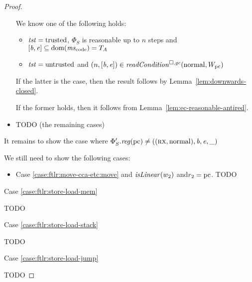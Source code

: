 \begin{proof}
\begin{itemize}
    We know one of the following holds:
    \begin{itemize}
    \item $\mathit{tst} = \mathrm{trusted}$, $\Phi_S$ is reasonable up to $n$ steps and $[\baddr,\eaddr] \subseteq \dom(\mscode) = \ta$
    \item $\mathit{tst} = \mathrm{untrusted}$ and $\npair{[\baddr,\eaddr]} \in \readCond{\normal,W_\pcreg}$
    \end{itemize}
    If the latter is the case, then the result follows by Lemma~\ref{lem:downwards-closed}.

    If the former holds, then it follows from Lemma~\ref{lem:ec-reasonable-antired}.

    \item TODO (the remaining cases)
  \end{itemize}

  It remains to show the case where $\Phi_S'.\reg(\pcreg) \neq ((\rx,\normal),\baddr,\eaddr,\_)$
  
  We still need to show the following cases:
  \begin{itemize}
  \item Case \ref{case:ftlr:move-cca-etc:move} and $\isLinear{w_2}$ and$r_2 = \mathrm{pc}$.
    TODO
  \end{itemize}

  Case \ref{case:ftlr:store-load-mem}

  TODO

  Case \ref{case:ftlr:store-load-stack}

  TODO

  Case \ref{case:ftlr:store-load-jump}

  TODO
\end{proof}

